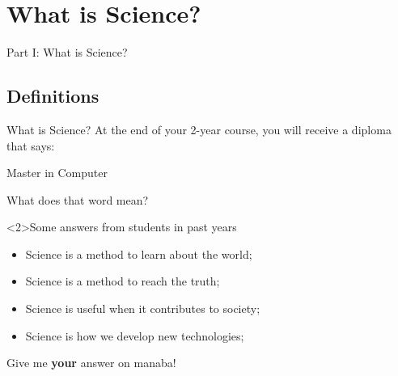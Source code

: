 \section{What is Science?}

\begin{frame}
  \begin{center}
    Part I: What is Science?
  \end{center}
\end{frame}

\subsection{Definitions}
\begin{frame}{What is Science?}
  At the end of your 2-year course, you will receive a diploma that says:
  \begin{center}
    Master in Computer 
  \end{center}
  What does that word mean?
  \bigskip

  \begin{block}<2>{Some answers from students in past years}
    \begin{itemize}
      \item Science is a method to learn about the world;
      \item Science is a method to reach the truth;
      \item Science is useful when it contributes to society;
      \item Science is how we develop new technologies;
    \end{itemize}
  \end{block}\bigskip

  Give me {\bf your} answer on manaba!
\end{frame}

